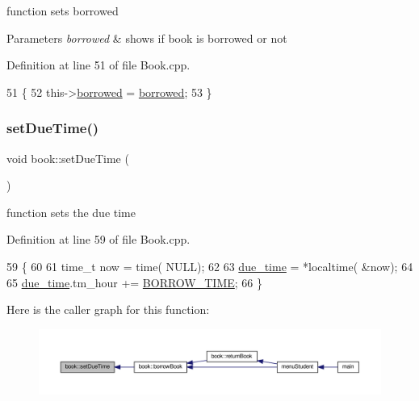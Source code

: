 function sets borrowed 
\begin{DoxyParams}{Parameters}
{\em borrowed} & shows if book is borrowed or not \\
\hline
\end{DoxyParams}


Definition at line 51 of file Book.\+cpp.


\begin{DoxyCode}
51                                     \{
52     this->\hyperlink{classbook_ab745520ed537e69bde6f2e3d7a103276}{borrowed} = \hyperlink{classbook_ab745520ed537e69bde6f2e3d7a103276}{borrowed};
53 \}
\end{DoxyCode}
\mbox{\label{classbook_a61624bab2476a61fb2f27ebf7c8976e3}} 
\subsubsection{\texorpdfstring{set\+Due\+Time()}{setDueTime()}}
{\footnotesize\ttfamily void book\+::set\+Due\+Time (\begin{DoxyParamCaption}{ }\end{DoxyParamCaption})}

function sets the due time 

Definition at line 59 of file Book.\+cpp.


\begin{DoxyCode}
59                       \{
60 
61      time\_t now = time( NULL);
62 
63      \hyperlink{classbook_abf72d9a32cdadee632df5a626dbe33b8}{due\_time} = *localtime( &now);
64 
65      \hyperlink{classbook_abf72d9a32cdadee632df5a626dbe33b8}{due\_time}.tm\_hour += \hyperlink{_book_8h_aded88185ac6dc121bc515c79c54a917a}{BORROW\_TIME};
66 \}
\end{DoxyCode}
Here is the caller graph for this function\+:
\nopagebreak
\begin{figure}[H]
\begin{center}
\leavevmode
\includegraphics[width=350pt]{classbook_a61624bab2476a61fb2f27ebf7c8976e3_icgraph}
\end{center}
\end{figure}
\mbox{\label{classbook_a40395f6b694a4c816bcf7a0ef279cf26}} 
